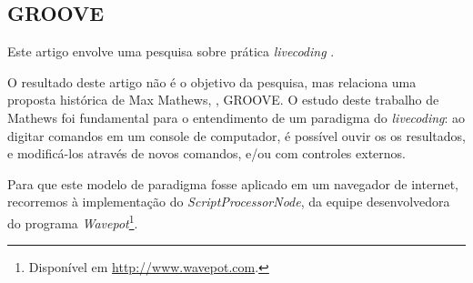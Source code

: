 \subsection{GROOVE}

Este artigo envolve uma pesquisa sobre prática \emph{livecoding} \cite{collins_origins_2014,prospero_social_2015,prospero_social_2015}. 

O resultado deste artigo não é o objetivo da pesquisa, mas relaciona uma proposta histórica de Max Mathews, \cite{mathews_groove_1970}, GROOVE. O estudo deste trabalho de Mathews foi fundamental para o entendimento de um paradigma do \emph{livecoding}: ao digitar comandos em um console de computador, é possível ouvir os os resultados, e modificá-los através de novos comandos, e/ou com controles externos. 

Para que este modelo de paradigma fosse aplicado em um navegador de internet, recorremos à implementação do \emph{ScriptProcessorNode}, da equipe desenvolvedora do programa \emph{Wavepot}\footnote{Disponível em \url{http://www.wavepot.com}.}. 


